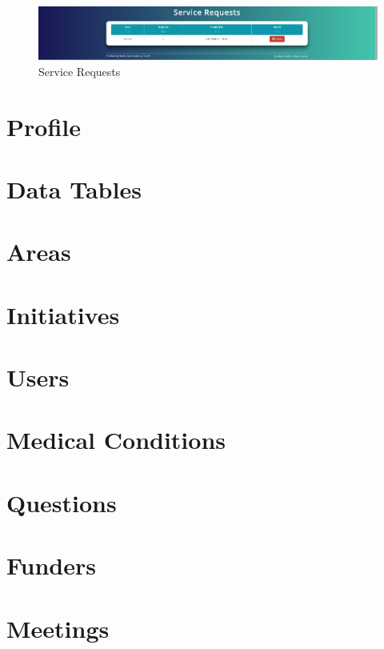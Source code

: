 \documentclass{bhcguides}
\begin{document}
\begin{figure}[h!]
 \centerline{\includegraphics[width=\textwidth, height=\textheight, keepaspectratio]{homepage3.png}}
 \caption{Service Requests}
 \label{fig:serviceRequests}
\end{figure}

\section{Profile}
\label{sec:profile}

\section{Data Tables}
\label{sec:datatables}

\section{Areas}
\label{sec:areas}

\section{Initiatives}
\label{sec:initiatives}

\section{Users}
\label{sec:users}

\section{Medical Conditions}
\label{sec:medical}

\section{Questions}
\label{sec:questions}

\section{Funders}
\label{sec:funders}

\section{Meetings}
\label{sec:meetings}
\end{document}
